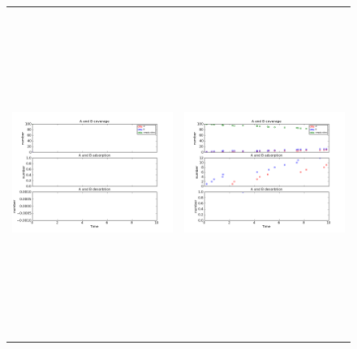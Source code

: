\documentclass[11pt]{article}
\begin{document}
\setlength{\unitlength}{1in}
\begin{figure}[h!]
\begin{tabular}{cc}
\includegraphics[width=3.5in, height=4.2in]{./coadsorb/AtoBcoadsorb10x10_101_allsameklarge__A5_EA10E3_1.png} &
\includegraphics[width=3.5in, height=4.2in]{./coadsorb/AtoBcoadsorb10x10_201_allsameklarge__A5_EA10E3_1.png} \\

\end{tabular}
\end{figure}
\end{document}
